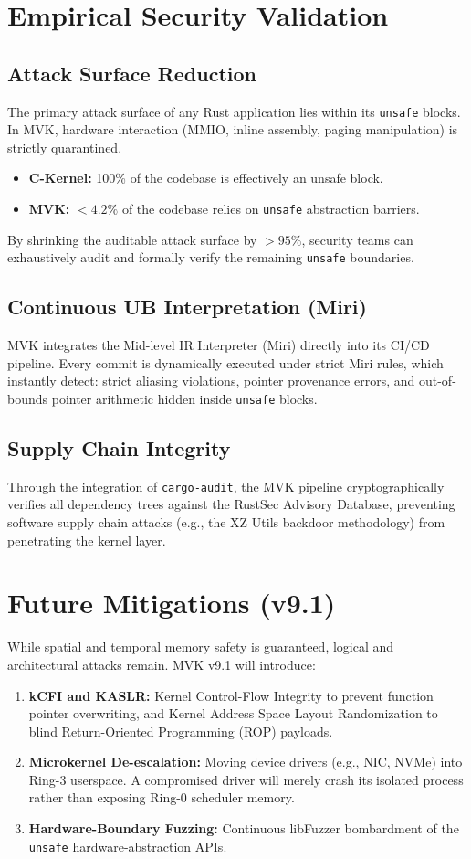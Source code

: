 \documentclass[conference]{IEEEtran}
\begin{document}
\section{Empirical Security Validation}

\subsection{Attack Surface Reduction}
The primary attack surface of any Rust application lies within its \texttt{unsafe} blocks. In MVK, hardware interaction (MMIO, inline assembly, paging manipulation) is strictly quarantined.
\begin{itemize}
    \item \textbf{C-Kernel:} 100\% of the codebase is effectively an unsafe block.
    \item \textbf{MVK:} $<4.2\%$ of the codebase relies on \texttt{unsafe} abstraction barriers.
\end{itemize}
By shrinking the auditable attack surface by $>95\%$, security teams can exhaustively audit and formally verify the remaining \texttt{unsafe} boundaries.

\subsection{Continuous UB Interpretation (Miri)}
MVK integrates the Mid-level IR Interpreter (Miri) directly into its CI/CD pipeline. Every commit is dynamically executed under strict Miri rules, which instantly detect: strict aliasing violations, pointer provenance errors, and out-of-bounds pointer arithmetic hidden inside \texttt{unsafe} blocks.

\subsection{Supply Chain Integrity}
Through the integration of \texttt{cargo-audit}, the MVK pipeline cryptographically verifies all dependency trees against the RustSec Advisory Database, preventing software supply chain attacks (e.g., the XZ Utils backdoor methodology) from penetrating the kernel layer.

\section{Future Mitigations (v9.1)}
While spatial and temporal memory safety is guaranteed, logical and architectural attacks remain. MVK v9.1 will introduce:
\begin{enumerate}
    \item \textbf{kCFI and KASLR:} Kernel Control-Flow Integrity to prevent function pointer overwriting, and Kernel Address Space Layout Randomization to blind Return-Oriented Programming (ROP) payloads.
    \item \textbf{Microkernel De-escalation:} Moving device drivers (e.g., NIC, NVMe) into Ring-3 userspace. A compromised driver will merely crash its isolated process rather than exposing Ring-0 scheduler memory.
    \item \textbf{Hardware-Boundary Fuzzing:} Continuous libFuzzer bombardment of the \texttt{unsafe} hardware-abstraction APIs.
\end{enumerate}
\end{document}
